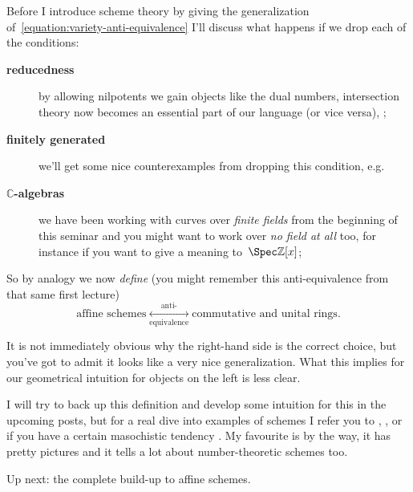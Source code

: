 Before I introduce scheme theory by giving the generalization of~\eqref{equation:variety-anti-equivalence} I'll discuss what happens if we drop each of the conditions:
\begin{description}
  \item[\textbf{reducedness}] by allowing nilpotents we gain objects like the dual numbers, intersection theory now becomes an essential part of our language (or vice versa), ;
  \item[\textbf{finitely generated}] we'll get some nice counterexamples from dropping this condition, e.g.\ 
  \item[\textbf{$\mathbb{C}$-algebras}] we have been working with curves over \emph{finite fields} from the beginning of this seminar and you might want to work over \emph{no field at all} too, for instance if you want to give a meaning to~$\Spec\mathbb{Z}[x]$;
\end{description}

So by analogy we now \emph{define} (you might remember this anti-equivalence from that same first lecture)
\begin{equation}
  \text{affine schemes} \underset{\text{equivalence}}{\overset{\text{anti-}}{\longleftrightarrow}} \text{commutative and unital rings}.
  \label{equation:scheme-anti-equivalence}
\end{equation}

It is not immediately obvious why the right-hand side is the correct choice, but you've got to admit it looks like a very nice generalization. What this implies for our geometrical intuition for objects on the left is less clear.

I will try to back up this definition and develop some intuition for this in the upcoming posts, but for a real dive into examples of schemes I refer you to \cite{geometry-of-schemes}, \cite{foag}, \cite{red-book} or if you have a certain masochistic tendency \cite{hartshorne}. My favourite is \cite{foag} by the way, it has pretty pictures and it tells a lot about number-theoretic schemes too.

Up next: the complete build-up to affine schemes.
